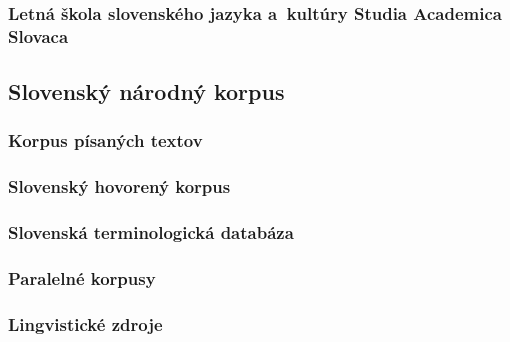\documentclass[]{../metanetpaper}
\begin{document}
\begin{multicols}{2}
\subsubsection{Letná škola slovenského jazyka a~kultúry Studia Academica Slovaca}


\subsection{Slovenský národný korpus}

\subsubsection{Korpus písaných textov}

\subsubsection{Slovenský hovorený korpus}

\subsubsection{Slovenská terminologická databáza}

\subsubsection{Paralelné korpusy}

\subsubsection{Lingvistické zdroje}

\end{multicols}

\clearpage
\end{document}
